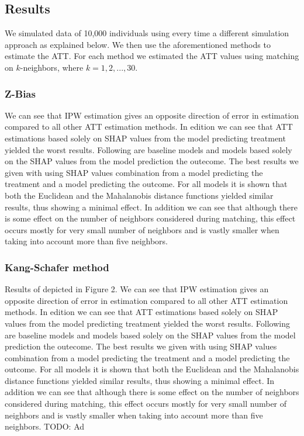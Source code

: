 \documentclass{article}
\begin{document}
\subsection{Results}
We simulated data of 10,000 individuals using every time a different simulation approach as explained below. 
We then use the aforementioned methods to estimate the ATT.
For each method we estimated the ATT values using matching on $k$-neighbors, where $k = 1, 2, ..., 30$. 

\subsubsection{Z-Bias}
We can see that IPW estimation gives an opposite direction of error in estimation compared to all other ATT estimation methods. In edition we can see
that ATT estimations based solely on SHAP values from the model predicting
treatment yielded the worst results. Following are baseline models and models based solely on the SHAP values from the model prediction the outecome.
The best results we given with using SHAP values combination from a model
predicting the treatment and a model predicting the outcome.
For all models it is shown that both the Euclidean and the Mahalanobis
distance functions yielded similar results, thus showing a minimal effect.
In addition we can see that although there is some effect on the number of
neighbors considered during matching, this effect occurs mostly for very small
number of neighbors and is vastly smaller when taking into account more than
five neighbors.

\subsubsection{Kang-Schafer method}
Results of depicted in Figure 2. We can see that IPW estimation gives an opposite direction of error in estimation compared to all other ATT estimation methods. In edition we can see
that ATT estimations based solely on SHAP values from the model predicting
treatment yielded the worst results. Following are baseline models and models based solely on the SHAP values from the model prediction the outecome.
The best results we given with using SHAP values combination from a model
predicting the treatment and a model predicting the outcome.
For all models it is shown that both the Euclidean and the Mahalanobis
distance functions yielded similar results, thus showing a minimal effect.
In addition we can see that although there is some effect on the number of
neighbors considered during matching, this effect occurs mostly for very small
number of neighbors and is vastly smaller when taking into account more than
five neighbors.
TODO: Ad
\end{document}
